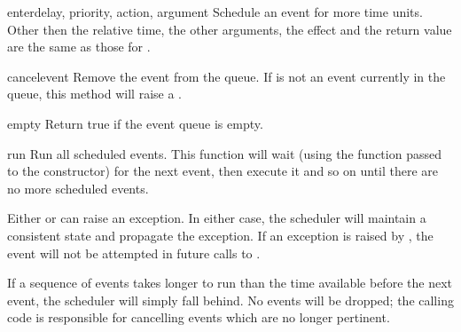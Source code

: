\begin{methoddesc}{enter}{delay, priority, action, argument}
Schedule an event for  more time units. Other then the
relative time, the other arguments, the effect and the return value
are the same as those for .
\end{methoddesc}

\begin{methoddesc}{cancel}{event}
Remove the event from the queue. If  is not an event
currently in the queue, this method will raise a
.
\end{methoddesc}

\begin{methoddesc}{empty}{}
Return true if the event queue is empty.
\end{methoddesc}

\begin{methoddesc}{run}{}
Run all scheduled events. This function will wait 
(using the  function passed to the constructor)
for the next event, then execute it and so on until there are no more
scheduled events.

Either  or  can raise an exception.  In
either case, the scheduler will maintain a consistent state and
propagate the exception.  If an exception is raised by ,
the event will not be attempted in future calls to .

If a sequence of events takes longer to run than the time available
before the next event, the scheduler will simply fall behind.  No
events will be dropped; the calling code is responsible for cancelling 
events which are no longer pertinent.
\end{methoddesc}
